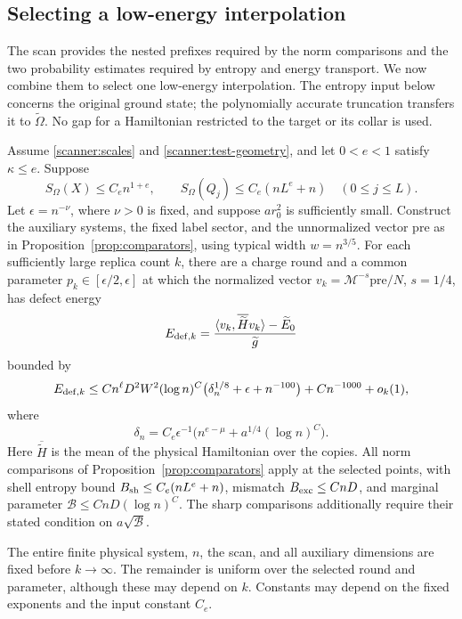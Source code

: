 \subsection{Selecting a low-energy interpolation}

The scan provides the nested prefixes required by the norm comparisons
and the two probability estimates required by entropy and energy transport.
We now combine them to select one low-energy interpolation.  The entropy
input below concerns the original ground state; the polynomially accurate
truncation transfers it to \(\widetilde\Omega\).  No gap for a Hamiltonian
restricted to the target or its collar is used.

\begin{proposition}
\label{prop:scanner}
Assume \eqref{scanner:scales} and \eqref{scanner:test-geometry}, and let
\(0<e<1\) satisfy \(\kappa\le e\).  Suppose
\begin{equation}
 S_\Omega(X)\le C_e n^{1+e},\qquad
 S_\Omega(Q_j)\le C_e(nL^e+n)\quad(0\le j\le L).
 \label{scanner:entropy-input}
\end{equation}
Let \(\epsilon=n^{-\nu}\), where \(\nu>0\) is fixed, and suppose
\(a r_0^2\) is sufficiently small.  Construct the auxiliary systems,
the fixed label sector, and the unnormalized vector \(\mathrm{pre}\)
as in Proposition~\ref{prop:comparators}, using typical width
\(w=n^{3/5}\).  For each sufficiently large replica count \(k\),
there are a charge round and a common parameter
\(p_k\in[\epsilon/2,\epsilon]\) at which the normalized vector
\(v_k=\mathcal M^{-s}\mathrm{pre}/N\), \(s=1/4\), has defect energy
\[
 E_{{\rm def},k}
 =\frac{\langle v_k,\overline{\widetilde H}v_k\rangle
                         -\widetilde E_0}{\widetilde g}
\]
bounded by
\begin{equation}
 E_{{\rm def},k}
 \le Cn^\ell D^2W^2(\log n)^C
        \bigl(\delta_n^{1/8}+\epsilon+n^{-100}\bigr)
        +Cn^{-1000}+o_k(1),
 \label{scanner:energy-output}
\end{equation}
where
\begin{equation}
 \delta_n=C_e\epsilon^{-1}
        \bigl(n^{e-\mu}+a^{1/4}(\log n)^C\bigr).
 \label{scanner:density-output}
\end{equation}
Here \(\overline{\widetilde H}\) is the mean of the physical
Hamiltonian over the copies.  All norm comparisons of
Proposition~\ref{prop:comparators} apply at the selected points, with
shell entropy bound \(B_{\rm sh}\le C_e(nL^e+n)\), mismatch
\(B_{\rm exc}\le CnD\), and marginal parameter
\(\mathcal B\le CnD(\log n)^C\).  The sharp comparisons additionally
require their stated condition on \(a\sqrt{\mathcal B}\).

The entire finite physical system, \(n\), the scan, and all auxiliary
dimensions are fixed before \(k\to\infty\).  The remainder is uniform
over the selected round and parameter, although these may depend on \(k\).
Constants may depend on the fixed exponents and the input constant \(C_e\).
\end{proposition}

